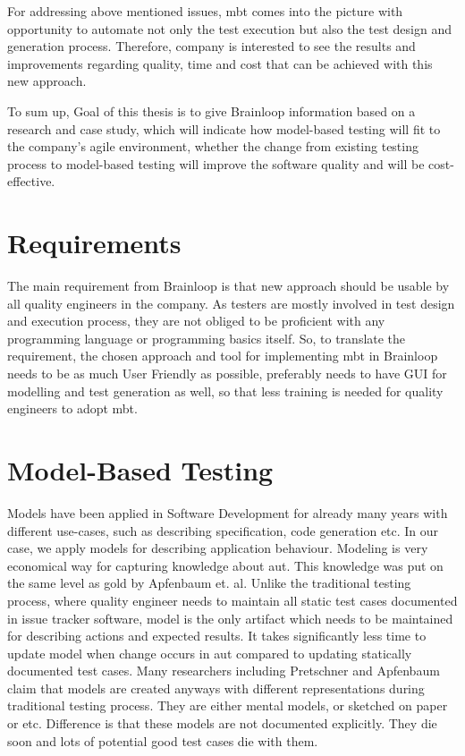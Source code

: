 \par
For addressing above mentioned issues, \acrlong{mbt} comes into the picture with opportunity to automate not only the test execution but also the test design and generation process. Therefore, company is interested to see the results and improvements regarding quality, time and cost that can be achieved with this new approach.

\par
To sum up, Goal of this thesis is to give Brainloop information based on a research and case study, which will indicate how model-based testing will fit to the company’s agile environment, whether the change from existing testing process to model-based testing will improve the software quality and will be cost-effective.

\section{Requirements}

\par
The main requirement from Brainloop is that new approach should be usable by all quality engineers in the company. As testers are mostly involved in test design and execution process, they are not obliged to be proficient with any programming language or programming basics itself. So, to translate the requirement, the chosen approach and tool for implementing \acrlong{mbt} in Brainloop needs to be as much User Friendly as possible, preferably needs to have GUI for modelling and test generation as well, so that less training is needed for quality engineers to adopt \acrlong{mbt}.

\section{Model-Based Testing}

\par
Models have been applied in Software Development for already many years with different use-cases, such as describing specification, code generation etc. In our case, we apply models for describing application behaviour. Modeling is very economical way for capturing knowledge about \acrlong{aut}. This knowledge was put on the same level as gold by Apfenbaum et. al. Unlike the traditional testing process, where quality engineer needs to maintain all static test cases documented in issue tracker software, model is the only artifact which needs to be maintained for describing actions and expected results. It takes significantly less time to update model when change occurs in \acrlong{aut} compared to updating statically documented test cases. Many researchers including Pretschner and Apfenbaum claim that models are created anyways with different representations during traditional testing process. They are either mental models, or sketched on paper or etc. Difference is that these models are not documented explicitly. They die soon and lots of potential good test cases die with them.

